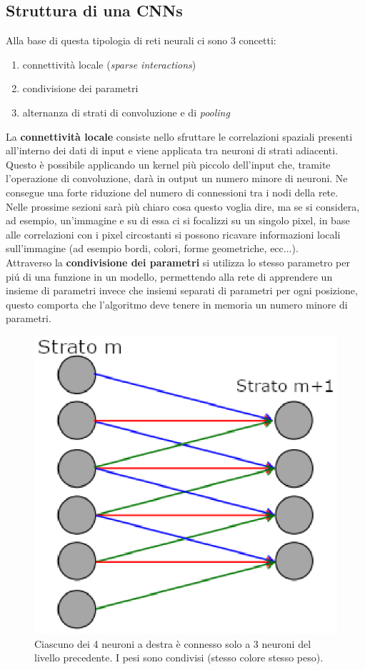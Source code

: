 \documentclass[a4paper,12pt,oneside]{book}
\begin{document}
\subsection{Struttura di una CNNs}
Alla base di questa tipologia di reti neurali ci sono 3 concetti:
\begin{enumerate}
\item connettivit\`{a} locale (\textit{sparse interactions})
\item condivisione dei parametri
\item alternanza di strati di convoluzione e di \textit{pooling}
\end{enumerate}
La \textbf{connettivit\`{a} locale} consiste nello sfruttare le correlazioni spaziali presenti all'interno dei dati di input e viene applicata tra neuroni di strati adiacenti. Questo \`e possibile applicando un kernel pi\`{u} piccolo dell'input che, tramite l'operazione di convoluzione, dar\`{a} in output un numero minore di neuroni. Ne consegue una forte riduzione del numero di connessioni tra i nodi della rete.\\
Nelle prossime sezioni sar\`{a} pi\`{u} chiaro cosa questo voglia dire, ma se si considera, ad esempio, un'immagine e su di essa ci si focalizzi su un singolo pixel, in base alle correlazioni con i pixel circostanti si possono ricavare informazioni locali sull'immagine (ad esempio bordi, colori, forme geometriche, ecc...).\\
Attraverso la \textbf{condivisione dei parametri} si utilizza lo stesso parametro per pi\'{u} di una funzione in un modello, permettendo alla rete di apprendere un insieme di parametri invece che insiemi separati di parametri per ogni posizione, questo comporta che l'algoritmo deve tenere in memoria un numero minore di parametri.\\
\begin{figure}[!h]
\centering
\includegraphics{CNN}
\caption{Ciascuno dei 4 neuroni a destra \`{e} connesso solo a 3 neuroni del livello precedente. I pesi sono condivisi (stesso colore stesso peso).}
\end{figure}
\end{document}
